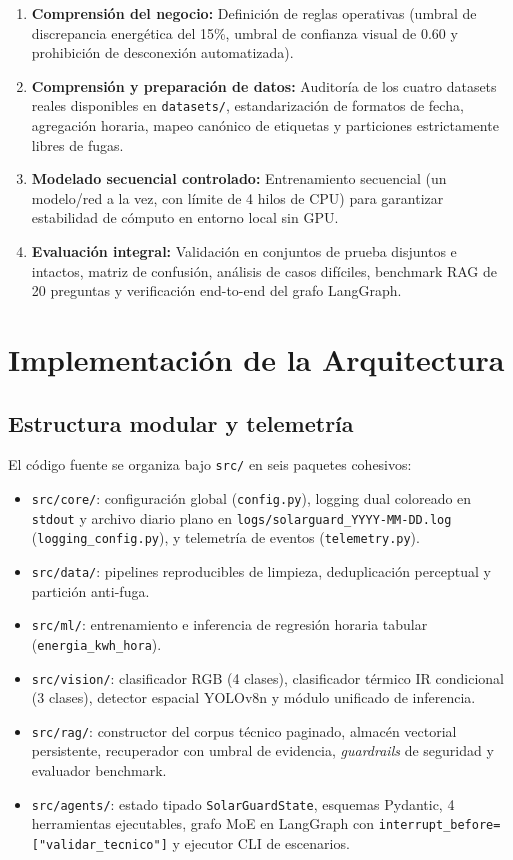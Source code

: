 \documentclass[12pt,a4paper]{article}
\begin{document}
\begin{enumerate}
    \item \textbf{Comprensión del negocio:} Definición de reglas operativas (umbral de discrepancia energética del 15\%, umbral de confianza visual de 0.60 y prohibición de desconexión automatizada).
    \item \textbf{Comprensión y preparación de datos:} Auditoría de los cuatro datasets reales disponibles en \texttt{datasets/}, estandarización de formatos de fecha, agregación horaria, mapeo canónico de etiquetas y particiones estrictamente libres de fugas.
    \item \textbf{Modelado secuencial controlado:} Entrenamiento secuencial (un modelo/red a la vez, con límite de 4 hilos de CPU) para garantizar estabilidad de cómputo en entorno local sin GPU.
    \item \textbf{Evaluación integral:} Validación en conjuntos de prueba disjuntos e intactos, matriz de confusión, análisis de casos difíciles, benchmark RAG de 20 preguntas y verificación end-to-end del grafo LangGraph.
\end{enumerate}

\section{Implementación de la Arquitectura}

\subsection{Estructura modular y telemetría}
El código fuente se organiza bajo \texttt{src/} en seis paquetes cohesivos:
\begin{itemize}
    \item \texttt{src/core/}: configuración global (\texttt{config.py}), logging dual coloreado en \texttt{stdout} y archivo diario plano en \texttt{logs/solarguard\_YYYY-MM-DD.log} (\texttt{logging\_config.py}), y telemetría de eventos (\texttt{telemetry.py}).
    \item \texttt{src/data/}: pipelines reproducibles de limpieza, deduplicación perceptual y partición anti-fuga.
    \item \texttt{src/ml/}: entrenamiento e inferencia de regresión horaria tabular (\texttt{energia\_kwh\_hora}).
    \item \texttt{src/vision/}: clasificador RGB (4 clases), clasificador térmico IR condicional (3 clases), detector espacial YOLOv8n y módulo unificado de inferencia.
    \item \texttt{src/rag/}: constructor del corpus técnico paginado, almacén vectorial persistente, recuperador con umbral de evidencia, \textit{guardrails} de seguridad y evaluador benchmark.
    \item \texttt{src/agents/}: estado tipado \texttt{SolarGuardState}, esquemas Pydantic, 4 herramientas ejecutables, grafo MoE en LangGraph con \texttt{interrupt\_before=["validar\_tecnico"]} y ejecutor CLI de escenarios.
\end{itemize}
\end{document}

